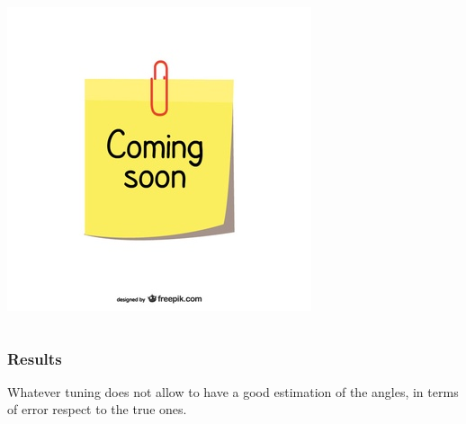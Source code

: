 \documentclass{beamer}
\begin{document}
\begin{frame}
\begin{columns}[t]
			\includegraphics[scale= 0.3]{coming-soon}
		\end{columns}
	\end{frame}

	\begin{frame}
		\frametitle{Results}
		Whatever tuning does not allow to have a good estimation of the angles, in terms of error respect to the true ones.
	\end{frame}


		
			
			
	
	
\end{document}

